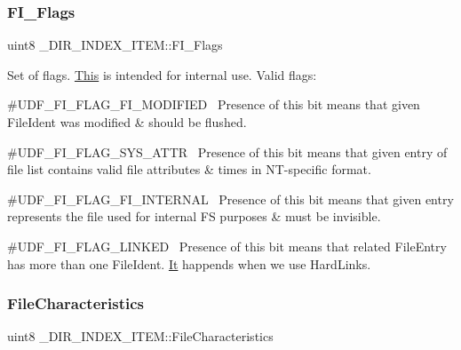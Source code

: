 \subsubsection{\texorpdfstring{F\+I\+\_\+\+Flags}{FI\_Flags}}
{\footnotesize\ttfamily uint8 \+\_\+\+D\+I\+R\+\_\+\+I\+N\+D\+E\+X\+\_\+\+I\+T\+E\+M\+::\+F\+I\+\_\+\+Flags}

Set of flags. \hyperlink{namespace_this}{This} is intended for internal use. Valid flags\+:
\begin{DoxyItemize}
\item \#\+U\+D\+F\+\_\+\+F\+I\+\_\+\+F\+L\+A\+G\+\_\+\+F\+I\+\_\+\+M\+O\+D\+I\+F\+I\+ED~\newline
Presence of this bit means that given File\+Ident was modified \& should be flushed.
\item \#\+U\+D\+F\+\_\+\+F\+I\+\_\+\+F\+L\+A\+G\+\_\+\+S\+Y\+S\+\_\+\+A\+T\+TR~\newline
Presence of this bit means that given entry of file list contains valid file attributes \& times in N\+T-\/specific format.
\item \#\+U\+D\+F\+\_\+\+F\+I\+\_\+\+F\+L\+A\+G\+\_\+\+F\+I\+\_\+\+I\+N\+T\+E\+R\+N\+AL~\newline
Presence of this bit means that given entry represents the file used for internal FS purposes \& must be invisible.
\item \#\+U\+D\+F\+\_\+\+F\+I\+\_\+\+F\+L\+A\+G\+\_\+\+L\+I\+N\+K\+ED~\newline
Presence of this bit means that related File\+Entry has more than one File\+Ident. \hyperlink{class_it}{It} happends when we use Hard\+Links. 
\end{DoxyItemize}\mbox{\label{struct___d_i_r___i_n_d_e_x___i_t_e_m_ab4e803bae65c800a47385cfa7e434919}} 
\subsubsection{\texorpdfstring{File\+Characteristics}{FileCharacteristics}}
{\footnotesize\ttfamily uint8 \+\_\+\+D\+I\+R\+\_\+\+I\+N\+D\+E\+X\+\_\+\+I\+T\+E\+M\+::\+File\+Characteristics}

